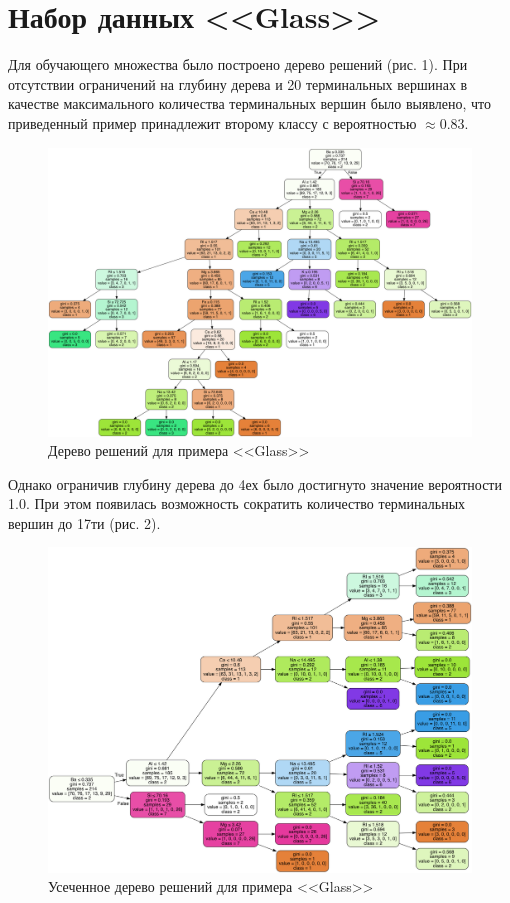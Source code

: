 \documentclass[]{article}
\numberwithin{equation}{section}
\begin{document}
    \section{Набор данных <<Glass>>}
        Для обучающего множества было построено дерево решений (рис. 1). При отсутствии ограничений на глубину дерева и 20 терминальных вершинах в качестве максимального количества терминальных вершин было выявлено, что приведенный пример принадлежит второму классу с вероятностью $\approx 0.83$.

        \begin{figure}[H]
            \centering
            \includegraphics[width = 1.0\linewidth]{data/glass_tree_full.png}
            \caption{Дерево решений для примера <<Glass>>}
        \end{figure}

        Однако ограничив глубину дерева до 4ех было достигнуто значение вероятности 1.0. При этом появилась возможность сократить количество терминальных вершин до 17ти (рис. 2).

        \begin{figure}[H]
            \centering
            \includegraphics[width = 1.0\linewidth]{data/glass_tree_opt.png}
            \caption{Усеченное дерево решений для примера <<Glass>>}
        \end{figure}
\end{document}
